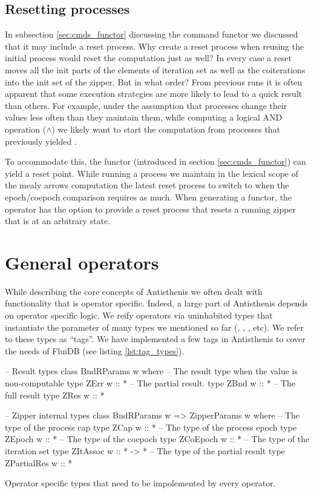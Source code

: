 \subsection{Resetting processes}
\label{sec:process_resetting}

In subsection \ref{sec:cmds_functor} discussing the command functor we
discussed that it may include a reset process. Why create a reset
process when reusing the initial process would reset the computation
just as well? In every case a reset moves all the init parts of the
elements of iteration set as well as the coiterations into the init
set of the zipper. But in what order? From previous runs it is often
apparent that some execution strategies are more likely to lead to a
quick result than others. For example, under the assumption that
processes change their values less often than they maintain them,
while computing a logical AND operation (\(\land\)) we likely want to
start the computation from processes that previously yielded
.

To accommodate this, the  functor (introduced in section
\ref{sec:cmds_functor}) can yield a reset point. While running a
process we maintain in the lexical scope of the mealy arrows
computation the latest reset process to switch to when the
epoch/coepoch comparison requires as much. When generating a
 functor, the operator has the option to provide a reset
process that resets a running zipper that is at an arbitrary state.

\section{General operators}
\label{sec:antisthenis_ops}

While describing the core concepts of Antisthenis we often dealt with
functionality that is operator specific. Indeed, a large part of
Antisthenis depends on operator specific logic. We reify operators via
uninhabited types that instantiate the  parameter of many
types we mentioned so far (, ,
, etc). We refer to these types as ``tags''. We have
implemented a few tags in Antisthenis to cover the needs of FluiDB
(see listing \ref{lst:tag_types}).


\begin{code}
\begin{haskellcode}
-- Result types
class BndRParams w where
  -- The result type when the value is non-computable
  type ZErr w :: *
  -- The partial result.
  type ZBnd w :: *
  -- The full result
  type ZRes w :: *

-- Zipper internal types
class BndRParams w => ZipperParams w where
  -- The type of the process cap
  type ZCap w :: *
  -- The type of the process epoch
  type ZEpoch w :: *
  -- The type of the coepoch
  type ZCoEpoch w :: *
  -- The type of the iteration set
  type ZItAssoc w :: * -> *
  -- The type of the partial result
  type ZPartialRes w :: *
\end{haskellcode}
  \caption{\label{lst:zipper_params}Operator specific types that need
    to be impolemented by every operator.}
\end{code}

